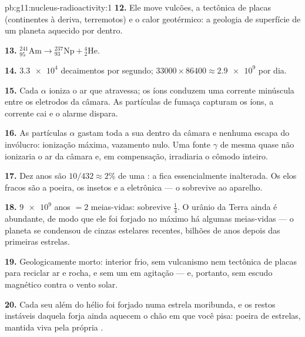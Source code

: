 \begin{solution}{pb:g11:nucleus-radioactivity:1}
\textbf{12.} Ele move vulcões, a tectônica de placas (continentes à
deriva, terremotos) e o calor geotérmico: a geologia de superfície de um
planeta aquecido por dentro.

\textbf{13.} ${}^{241}_{95}\mathrm{Am} \to {}^{237}_{93}\mathrm{Np} +
{}^{4}_{2}\mathrm{He}$.

\textbf{14.} $\num{3.3e4}$ decaimentos por segundo;
$\num{33000} \times 86400 \approx \num{2.9e9}$ por dia.

\textbf{15.} Cada $\alpha$ ioniza o ar que atravessa; os íons conduzem
uma corrente minúscula entre os eletrodos da câmara. As partículas de
fumaça capturam os íons, a corrente cai e o alarme dispara.

\textbf{16.} As partículas $\alpha$ gastam toda a sua  dentro da
câmara e nenhuma escapa do invólucro: ionização máxima, vazamento nulo.
Uma fonte $\gamma$ de mesma  quase não ionizaria o ar da câmara
e, em compensação, irradiaria o cômodo inteiro.

\textbf{17.} Dez anos são $10/432 \approx 2\%$ de uma : a
 fica essencialmente inalterada. Os elos fracos são a poeira, os
insetos e a eletrônica --- o  sobrevive ao aparelho.

\textbf{18.} $\num{9e9}$ anos $= 2$ meias-vidas: sobrevive $\frac14$. O
urânio da Terra ainda é abundante, de modo que ele foi forjado no máximo
há algumas meias-vidas --- o planeta se condensou de cinzas estelares
recentes, bilhões de anos depois das primeiras estrelas.

\textbf{19.} Geologicamente morto: interior frio, sem vulcanismo nem
tectônica de placas para reciclar ar e rocha, e sem um  em
agitação --- e, portanto, sem escudo magnético contra o vento solar.

\textbf{20.} Cada  seu além do hélio foi forjado numa estrela
moribunda, e os restos instáveis daquela forja ainda aquecem o chão em
que você pisa: poeira de estrelas, mantida viva pela própria .
\end{solution}
